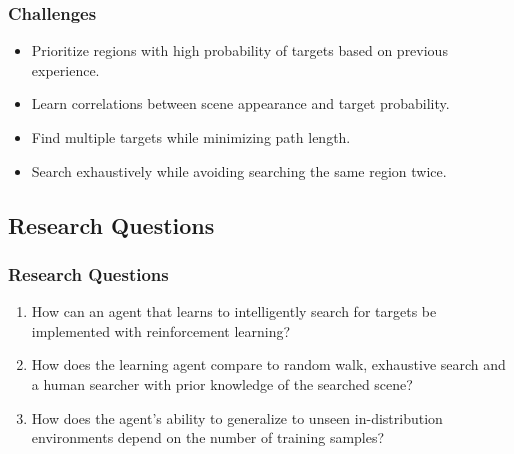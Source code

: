 \begin{frame}
    \frametitle{Challenges}

    \begin{itemize}
        \item Prioritize regions with high probability of targets based on previous experience.
        \item Learn correlations between scene appearance and target probability.
        \item Find multiple targets while minimizing path length.
        \item Search exhaustively while avoiding searching the same region twice.
    \end{itemize}
\end{frame}

\subsection{Research Questions}

\begin{frame}
    \frametitle{Research Questions}
    \begin{enumerate}
        \item How can an agent that learns to intelligently search for targets be implemented with reinforcement learning?
        \item How does the learning agent compare to random walk, exhaustive search and a human searcher with prior knowledge of the searched scene?
        \item How does the agent's ability to generalize to unseen in-distribution environments depend on the number of training samples?
    \end{enumerate}    
\end{frame}